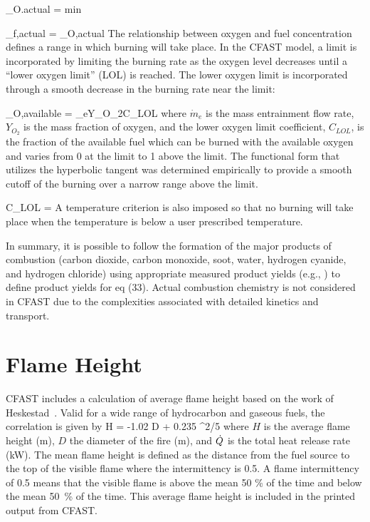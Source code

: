 \be {}_{O.actual} = min  \ee

\be {}_{f,actual} = _{O,actual}   \ee
The relationship between oxygen and fuel concentration defines a range in which burning will take place.  In the CFAST model, a limit is incorporated by limiting the burning rate as the oxygen level decreases until a ``lower oxygen limit'' (LOL) is reached. The lower oxygen limit is incorporated through a smooth decrease in the burning rate near the limit:

\be {}_{O,available} = _eY_{O_2}C_{LOL} \ee
where $\dot{m}_e$ is the mass entrainment flow rate, $Y_{O_2}$ is the mass fraction of oxygen, and the lower oxygen limit coefficient, $C_{LOL}$, is the fraction of the available fuel which can be burned with the available oxygen and varies from 0 at the limit to 1 above the limit.  The functional form that utilizes the hyperbolic tangent was determined empirically to provide a smooth cutoff of the burning over a narrow range above the limit.

\be C_{LOL} =  \ee
A temperature criterion is also imposed so that no burning will take place when the temperature is below a user prescribed temperature.

In summary, it is possible to follow the formation of the major products of combustion (carbon dioxide, carbon monoxide, soot, water, hydrogen cyanide, and hydrogen chloride) using appropriate measured product yields (e.g., \cite{Morehart:1991}) to define product yields for eq (33). Actual combustion chemistry is not considered in CFAST due to the complexities associated with detailed kinetics and transport.



\section{Flame Height}
\label{sec:firemassbalance}


CFAST includes a calculation of average flame height based on the work of Heskestad~\cite{Heskestad:2002}. Valid for a wide range of hydrocarbon and gaseous fuels, the correlation is given by
\be 
   H = -1.02 D + 0.235 ^{2/5} 
\ee
where $H$ is the average flame height (m), $D$ the diameter of the fire (m), and $\dot{Q}$ is the total heat release rate (kW). The mean flame height is defined as the distance from the fuel source to the top of the visible flame where the intermittency is 0.5.  A flame intermittency of 0.5 means that the visible flame is above the mean 50 \% of the time and below the mean 50~\% of the time.  This average flame height is  included in the printed output from CFAST.


